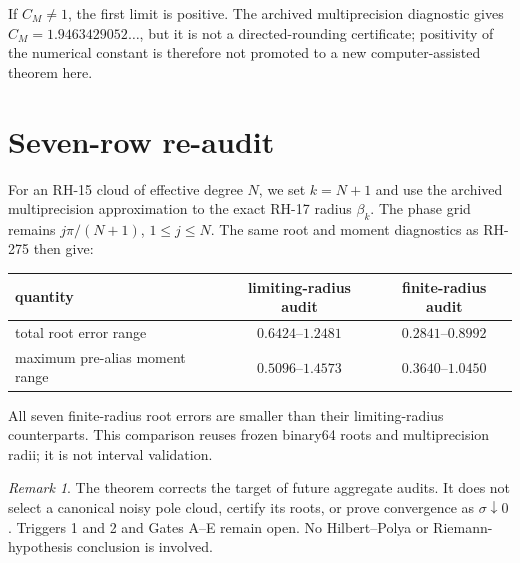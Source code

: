 \documentclass[11pt]{article}
\theoremstyle{remark}\newtheorem{remark}[theorem]{Remark}
\begin{document}
If $C_M\ne1$, the first limit is positive.  The archived multiprecision
diagnostic gives $C_M=1.9463429052\ldots$, but it is not a directed-rounding
certificate; positivity of the numerical constant is therefore not promoted
to a new computer-assisted theorem here.

\section{Seven-row re-audit}
For an RH-15 cloud of effective degree $N$, we set $k=N+1$ and use the
archived multiprecision approximation to the exact RH-17 radius $\beta_k$.
The phase grid remains
$j\pi/(N+1)$, $1\le j\le N$.  The same root and moment diagnostics as RH-275
then give:
\begin{center}\small
\begin{tabular}{lcc}\toprule
quantity & limiting-radius audit & finite-radius audit\\\midrule
total root error range & $0.6424$--$1.2481$ & $0.2841$--$0.8992$\\
maximum pre-alias moment range & $0.5096$--$1.4573$ & $0.3640$--$1.0450$\\\bottomrule
\end{tabular}
\end{center}
All seven finite-radius root errors are smaller than their limiting-radius
counterparts.  This comparison reuses frozen binary64 roots and
multiprecision radii; it is not interval validation.

\begin{remark}
The theorem corrects the target of future aggregate audits.  It does not
select a canonical noisy pole cloud, certify its roots, or prove convergence
as $\sigma\downarrow0$.  Triggers 1 and 2 and Gates A--E remain open.  No
Hilbert--Polya or Riemann-hypothesis conclusion is involved.
\end{remark}
\end{document}
